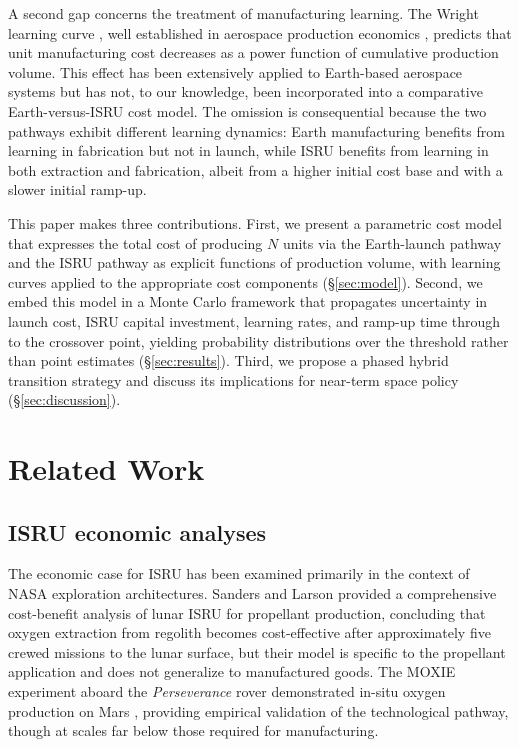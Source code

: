 \documentclass[preprint,12pt]{elsarticle}
\begin{document}
A second gap concerns the treatment of manufacturing learning. The Wright learning curve \cite{wright1936}, well established in aerospace production economics \cite{wertz2011}, predicts that unit manufacturing cost decreases as a power function of cumulative production volume. This effect has been extensively applied to Earth-based aerospace systems but has not, to our knowledge, been incorporated into a comparative Earth-versus-ISRU cost model. The omission is consequential because the two pathways exhibit different learning dynamics: Earth manufacturing benefits from learning in fabrication but not in launch, while ISRU benefits from learning in both extraction and fabrication, albeit from a higher initial cost base and with a slower initial ramp-up.

This paper makes three contributions. First, we present a parametric cost model that expresses the total cost of producing $N$ units via the Earth-launch pathway and the ISRU pathway as explicit functions of production volume, with learning curves applied to the appropriate cost components (\S\ref{sec:model}). Second, we embed this model in a Monte Carlo framework that propagates uncertainty in launch cost, ISRU capital investment, learning rates, and ramp-up time through to the crossover point, yielding probability distributions over the threshold rather than point estimates (\S\ref{sec:results}). Third, we propose a phased hybrid transition strategy and discuss its implications for near-term space policy (\S\ref{sec:discussion}).

\section{Related Work}
\label{sec:related}

\subsection{ISRU economic analyses}

The economic case for ISRU has been examined primarily in the context of NASA exploration architectures. Sanders and Larson \cite{sanders2015} provided a comprehensive cost-benefit analysis of lunar ISRU for propellant production, concluding that oxygen extraction from regolith becomes cost-effective after approximately five crewed missions to the lunar surface, but their model is specific to the propellant application and does not generalize to manufactured goods. The MOXIE experiment aboard the \textit{Perseverance} rover demonstrated in-situ oxygen production on Mars \cite{hecht2021}, providing empirical validation of the technological pathway, though at scales far below those required for manufacturing.
\end{document}
